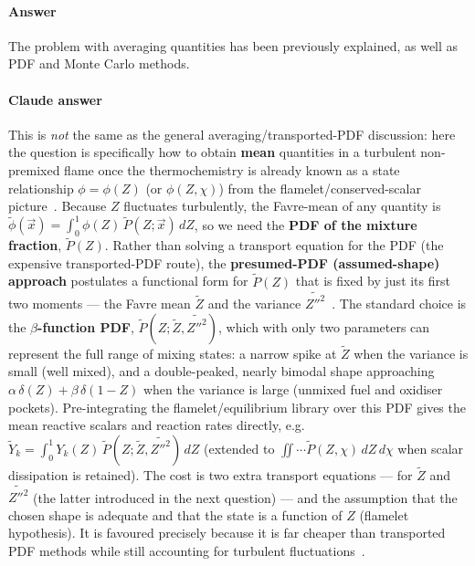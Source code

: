 \label{Q:AssumedPDF}

\paragraph{Answer} The problem with averaging quantities has been previously explained, as well as PDF and Monte Carlo methods.


{\color{istblue}
\paragraph{Claude answer}
This is \emph{not} the same as the general averaging/transported-PDF discussion: here the question is specifically how to obtain \textbf{mean} quantities in a turbulent non-premixed flame once the thermochemistry is already known as a state relationship $\phi = \phi(Z)$ (or $\phi(Z,\chi)$) from the flamelet/conserved-scalar picture~\cite{lecture10,warnatz2006combustion}. Because $Z$ fluctuates turbulently, the Favre-mean of any quantity is $\tilde\phi(\vec x) = \int_0^1 \phi(Z)\,\tilde P(Z;\vec x)\,dZ$, so we need the \textbf{PDF of the mixture fraction}, $\tilde P(Z)$. Rather than solving a transport equation for the PDF (the expensive transported-PDF route), the \textbf{presumed-PDF (assumed-shape) approach} postulates a functional form for $\tilde P(Z)$ that is fixed by just its first two moments --- the Favre mean $\tilde Z$ and the variance $\widetilde{Z''^2}$~\cite{lecture10,veynante2002turbulent,peters2000turbulent}. The standard choice is the \textbf{$\beta$-function PDF}, $\tilde P(Z;\tilde Z,\widetilde{Z''^2})$, which with only two parameters can represent the full range of mixing states: a narrow spike at $\tilde Z$ when the variance is small (well mixed), and a double-peaked, nearly bimodal shape approaching $\alpha\,\delta(Z)+\beta\,\delta(1-Z)$ when the variance is large (unmixed fuel and oxidiser pockets). Pre-integrating the flamelet/equilibrium library over this PDF gives the mean reactive scalars and reaction rates directly, e.g.\ $\tilde Y_k = \int_0^1 Y_k(Z)\,\tilde P(Z;\tilde Z,\widetilde{Z''^2})\,dZ$ (extended to $\iint \cdots \tilde P(Z,\chi)\,dZ\,d\chi$ when scalar dissipation is retained). The cost is two extra transport equations --- for $\tilde Z$ and $\widetilde{Z''^2}$ (the latter introduced in the next question) --- and the assumption that the chosen shape is adequate and that the state is a function of $Z$ (flamelet hypothesis). It is favoured precisely because it is far cheaper than transported PDF methods while still accounting for turbulent fluctuations~\cite{lecture10,peters2000turbulent}.
}






